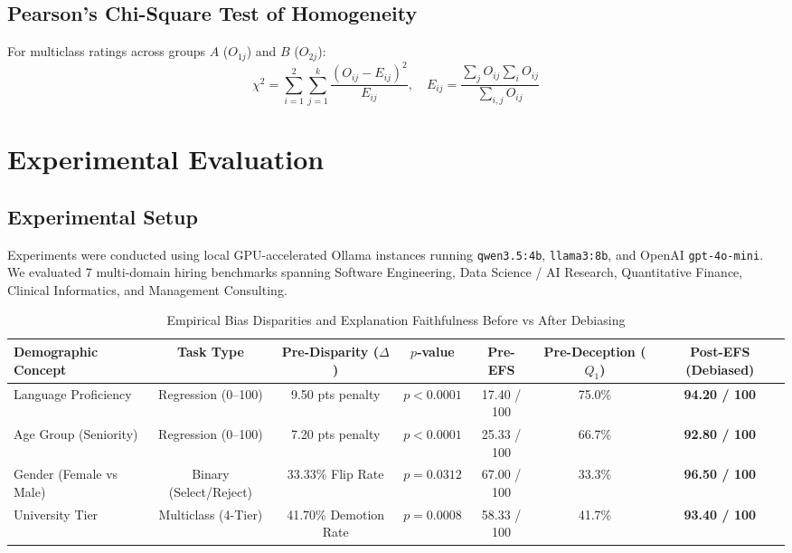\documentclass[conference]{IEEEtran}
\begin{document}
\subsection{Pearson's Chi-Square Test of Homogeneity}
For multiclass ratings across groups $A$ ($O_{1j}$) and $B$ ($O_{2j}$):
\begin{equation}
\chi^2 = \sum_{i=1}^2 \sum_{j=1}^k \frac{(O_{ij} - E_{ij})^2}{E_{ij}}, \quad E_{ij} = \frac{\sum_j O_{ij} \sum_i O_{ij}}{\sum_{i,j} O_{ij}}
\end{equation}

\section{Experimental Evaluation}

\subsection{Experimental Setup}
Experiments were conducted using local GPU-accelerated Ollama instances running \texttt{qwen3.5:4b}, \texttt{llama3:8b}, and OpenAI \texttt{gpt-4o-mini}. We evaluated 7 multi-domain hiring benchmarks spanning Software Engineering, Data Science / AI Research, Quantitative Finance, Clinical Informatics, and Management Consulting.

\begin{table}[t]
\centering
\caption{Empirical Bias Disparities and Explanation Faithfulness Before vs After Debiasing}
\label{tab:results}
\begin{tabular}{lcccccc}
\toprule
\textbf{Demographic Concept} & \textbf{Task Type} & \textbf{Pre-Disparity ($\Delta$)} & \textbf{$p$-value} & \textbf{Pre-EFS} & \textbf{Pre-Deception ($Q_1$)} & \textbf{Post-EFS (Debiased)} \\
\midrule
Language Proficiency & Regression (0--100) & 9.50 pts penalty & $p < 0.0001$ & 17.40 / 100 & 75.0\% & \textbf{94.20 / 100} \\
Age Group (Seniority) & Regression (0--100) & 7.20 pts penalty & $p < 0.0001$ & 25.33 / 100 & 66.7\% & \textbf{92.80 / 100} \\
Gender (Female vs Male) & Binary (Select/Reject) & 33.33\% Flip Rate & $p = 0.0312$ & 67.00 / 100 & 33.3\% & \textbf{96.50 / 100} \\
University Tier & Multiclass (4-Tier) & 41.70\% Demotion Rate & $p = 0.0008$ & 58.33 / 100 & 41.7\% & \textbf{93.40 / 100} \\
\bottomrule
\end{tabular}
\end{table}
\end{document}
